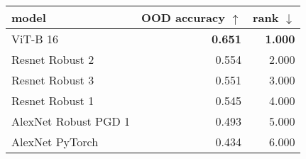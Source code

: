 \begin{tabular}{lrr}
\toprule
model & OOD accuracy $\uparrow$ & rank $\downarrow$ \\
\midrule
ViT-B 16 & \textbf{0.651} & \textbf{1.000} \\
Resnet Robust 2 & 0.554 & 2.000 \\
Resnet Robust 3 & 0.551 & 3.000 \\
Resnet Robust 1 & 0.545 & 4.000 \\
AlexNet Robust PGD 1 & 0.493 & 5.000 \\
AlexNet PyTorch & 0.434 & 6.000 \\
\bottomrule
\end{tabular}

